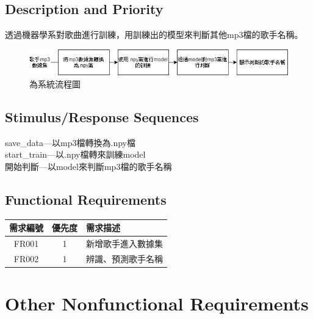 \documentclass{article}
\begin{document}
\begin{CJK}{UTF8}{bkai}
\subsection{\Large Description and Priority }
	
	透過機器學系對歌曲進行訓練，用訓練出的模型來判斷其他mp3檔的歌手名稱。
\begin{figure}[h]
\begin{center}
\includegraphics[width=14cm]{FS.jpg}
\end{center}
\caption{為系統流程圖}
\label{fig:2}
\end{figure}

\subsection{\Large Stimulus/Response Sequences}
	save\_data---以mp3檔轉換為.npy檔\\
	start\_train---以.npy檔轉來訓練model\\
	開始判斷---以model來判斷mp3檔的歌手名稱\\

\subsection{ \Large Functional Requirements}
 \begin{center}
	\begin{tabular}{|c|c|p{8cm}|}\hline
		需求編號 & 優先度 & 需求描述 \\ \hline
		FR001 & 1 & 新增歌手進入數據集 \\ \hline
		FR002 & 1 &  辨識、預測歌手名稱\\\hline
	\end{tabular}
\end{center}

\section{\huge\bf  \color {blue}  Other Nonfunctional Requirements }

\end{CJK}
\end{document}
